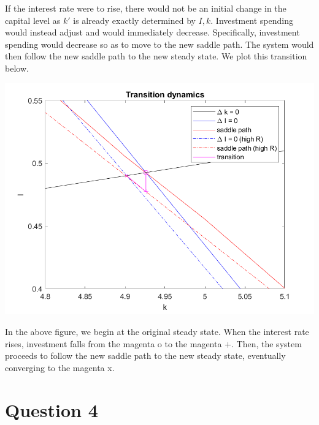 \documentclass[11pt]{article} %
\begin{document}
If the interest rate were to rise, there would not be an initial change in the capital level as $k'$ is already exactly determined by $I,k$. Investment spending would instead adjust and would immediately decrease. Specifically, investment spending would decrease so as to move to the new saddle path. The system would then follow the new saddle path to the new steady state. We plot this transition below.

\includegraphics{transition3}

In the above figure, we begin at the original steady state. When the  interest rate rises, investment falls from the magenta o to the magenta $+$. Then, the system proceeds to follow the new saddle path to the new steady state, eventually converging to the magenta x.

\section{Question 4}
\end{document}
